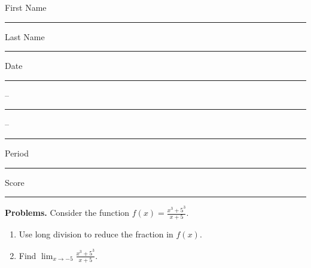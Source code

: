 \documentclass[twoside, 10pt]{article}
\title{}
\date{}
\begin{document}
\noindent
{\large
First Name \rule{6em}{.1pt}Last Name \rule{6em}{.1pt} Date \rule{1.5em}{.1pt} -- \rule{1.5em}{.1pt} -- \rule{1.5em}{.1pt} Period \rule{2em}{.1pt} Score \rule{2em}{.1pt}
}
\vspace{1em}

{\noindent\bf Problems.}
Consider the function $\displaystyle f(x) = \frac{x^3 +5^3}{x + 5}$.
\begin{enumerate}
\item
Use long division to reduce the fraction in $f(x)$.
\item 
Find $\displaystyle \lim_{x\to-5} \frac{x^3 +5^3}{x + 5}$.
\end{enumerate}
\end{document}
